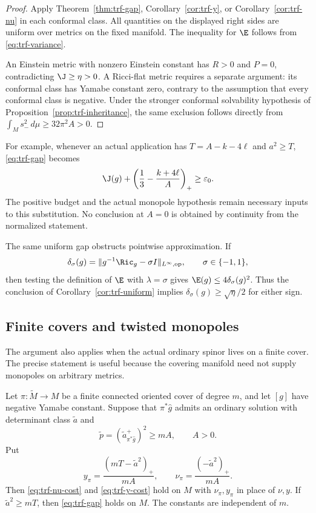 \begin{proof}
Apply Theorem~\ref{thm:trf-gap}, Corollary~\ref{cor:trf-y}, or
Corollary~\ref{cor:trf-nu} in each conformal class.  All quantities on
the displayed right sides are uniform over metrics on the fixed
manifold.  The inequality for $\E$ follows from
\eqref{eq:trf-variance}.

An Einstein metric with nonzero Einstein constant has $R>0$ and $P=0$,
contradicting $\J\ge\eta>0$.  A Ricci-flat metric requires a separate
argument: its conformal class has Yamabe constant zero, contrary to the
assumption that every conformal class is negative.  Under the stronger
conformal solvability hypothesis of Proposition~\ref{prop:trf-inheritance},
the same exclusion follows directly from
$\int_Ms_-^2\,d\mu\ge32\pi^2A>0$.
\end{proof}

For example, whenever an actual application has
$T=A-k-4\ell$ and $a^2\ge T$, \eqref{eq:trf-gap} becomes
\[
 \J(g)+\left(\frac13-\frac{k+4\ell}{A}\right)_+
 \ge\varepsilon_0.
\]
The positive budget and the actual monopole hypothesis remain necessary
inputs to this substitution.  No conclusion at $A=0$ is obtained by
continuity from the normalized statement.

The same uniform gap obstructs pointwise approximation.  If
\[
 \delta_\sigma(g)=
 \|g^{-1}\Ric_g-\sigma I\|_{L^\infty,\mathrm{op}},
 \qquad \sigma\in\{-1,1\},
\]
then testing the definition of $\E$ with $\lambda=\sigma$ gives
$\E(g)\le4\delta_\sigma(g)^2$.  Thus the conclusion of
Corollary~\ref{cor:trf-uniform} implies
$\delta_\sigma(g)\ge\sqrt\eta/2$ for either sign.

\subsection{Finite covers and twisted monopoles}

The argument also applies when the actual ordinary spinor lives on a
finite cover.  The precise statement is useful because the covering
manifold need not supply monopoles on arbitrary metrics.

\begin{proposition}
\label{prop:trf-cover}
Let $\pi:\widetilde M\to M$ be a finite connected oriented cover of degree $m$,
and let $[g]$ have negative Yamabe constant.  Suppose that
$\pi^*\widehat g$ admits an ordinary solution with determinant class
$\widetilde a$ and
\[
 \widetilde p=(\widetilde a_{\pi^*\widehat g}^+)^2\ge mA,
 \qquad A>0.
\]
Put
\[
 y_\pi=\frac{(mT-\widetilde a^2)_+}{mA},\qquad
 \nu_\pi=\frac{(-\widetilde a^2)_+}{mA}.
\]
Then \eqref{eq:trf-nu-cost} and \eqref{eq:trf-y-cost} hold on $M$
with $\nu_\pi,y_\pi$ in place of $\nu,y$.  If
$\widetilde a^2\ge mT$, then \eqref{eq:trf-gap} holds on $M$.
The constants are independent of $m$.
\end{proposition}

